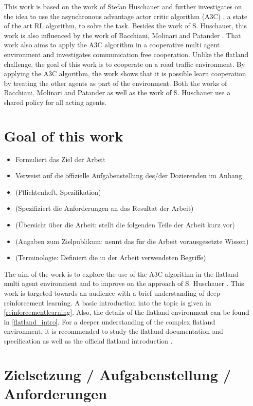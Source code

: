 This work is based on the work of Stefan Huschauer \cite{flatlandstephan} and further investigates on the idea to use the asynchronous advantage actor critic algorithm (A3C) \cite{a3c}, a state of the art RL algorithm, to solve the task.
Besides the work of S. Huschauer, this work is also influenced by the work of Bacchiani, Molinari and Patander \cite{marltraffica3c}. That work also aims to apply the A3C algorithm in a cooperative multi agent environment and investigates communication free cooperation.
Unlike the flatland challenge, the goal of this work is to cooperate on a road traffic environment. By applying the A3C algorithm, the work shows that it is possible learn cooperation by treating the other agents as part of the environment. Both the works of Bacchiani, Molinari and Patander as well as the work of S. Huschauer use a shared policy for all acting agents.



\section{Goal of this work}\label{zielsetzung}
\begin{itemize}
\item Formuliert das Ziel der Arbeit
\item Verweist auf die offizielle Aufgabenstellung des/der Dozierenden im Anhang
\item (Pflichtenheft, Spezifikation)
\item (Spezifiziert die Anforderungen an das Resultat der Arbeit)
\item (Übersicht über die Arbeit: stellt die folgenden Teile der Arbeit kurz vor)
\item (Angaben zum Zielpublikum: nennt das für die Arbeit vorausgesetzte Wissen)
\item (Terminologie: Definiert die in der Arbeit verwendeten Begriffe)
\end{itemize}
The aim of the work is to explore the use of the A3C algorithm in the flatland multi agent environment and to improve on the approach of S. Huschauer \cite{flatlandstephan}.
This work is targeted towards an audience with a brief understanding of deep reinforcement learning. A basic introduction into the topic is given in \autoref{reinforcementlearning}.
Also, the details of the flatland environment can be found in \autoref{flatland_intro}. For a deeper understanding of the complex flatland environment, it is recommended to study the flatland documentation and specification \cite{flatland_docu} as well as the official flatland introduction \cite{aicrowd}.


\section{Zielsetzung / Aufgabenstellung / Anforderungen}\label{zielsetzung}



